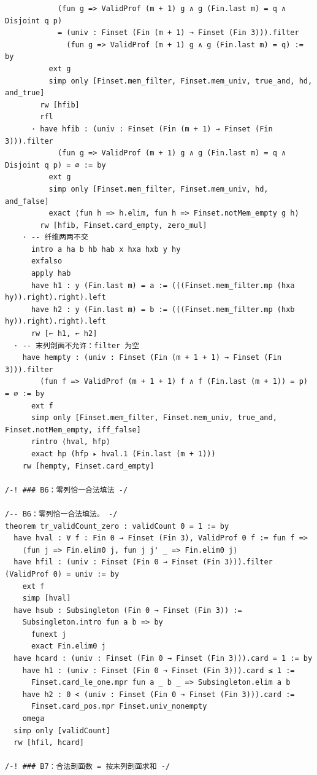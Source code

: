 \documentclass[11pt]{article}
\begin{document}
\begin{lstlisting}
            (fun g => ValidProf (m + 1) g ∧ g (Fin.last m) = q ∧ Disjoint q p)
            = (univ : Finset (Fin (m + 1) → Finset (Fin 3))).filter
              (fun g => ValidProf (m + 1) g ∧ g (Fin.last m) = q) := by
          ext g
          simp only [Finset.mem_filter, Finset.mem_univ, true_and, hd, and_true]
        rw [hfib]
        rfl
      · have hfib : (univ : Finset (Fin (m + 1) → Finset (Fin 3))).filter
            (fun g => ValidProf (m + 1) g ∧ g (Fin.last m) = q ∧ Disjoint q p) = ∅ := by
          ext g
          simp only [Finset.mem_filter, Finset.mem_univ, hd, and_false]
          exact ⟨fun h => h.elim, fun h => Finset.notMem_empty g h⟩
        rw [hfib, Finset.card_empty, zero_mul]
    · -- 纤维两两不交
      intro a ha b hb hab x hxa hxb y hy
      exfalso
      apply hab
      have h1 : y (Fin.last m) = a := (((Finset.mem_filter.mp (hxa hy)).right).right).left
      have h2 : y (Fin.last m) = b := (((Finset.mem_filter.mp (hxb hy)).right).right).left
      rw [← h1, ← h2]
  · -- 末列剖面不允许：filter 为空
    have hempty : (univ : Finset (Fin (m + 1 + 1) → Finset (Fin 3))).filter
        (fun f => ValidProf (m + 1 + 1) f ∧ f (Fin.last (m + 1)) = p) = ∅ := by
      ext f
      simp only [Finset.mem_filter, Finset.mem_univ, true_and, Finset.notMem_empty, iff_false]
      rintro ⟨hval, hfp⟩
      exact hp (hfp ▸ hval.1 (Fin.last (m + 1)))
    rw [hempty, Finset.card_empty]

/-! ### B6：零列恰一合法填法 -/

/-- B6：零列恰一合法填法。 -/
theorem tr_validCount_zero : validCount 0 = 1 := by
  have hval : ∀ f : Fin 0 → Finset (Fin 3), ValidProf 0 f := fun f =>
    ⟨fun j => Fin.elim0 j, fun j j' _ => Fin.elim0 j⟩
  have hfil : (univ : Finset (Fin 0 → Finset (Fin 3))).filter (ValidProf 0) = univ := by
    ext f
    simp [hval]
  have hsub : Subsingleton (Fin 0 → Finset (Fin 3)) :=
    Subsingleton.intro fun a b => by
      funext j
      exact Fin.elim0 j
  have hcard : (univ : Finset (Fin 0 → Finset (Fin 3))).card = 1 := by
    have h1 : (univ : Finset (Fin 0 → Finset (Fin 3))).card ≤ 1 :=
      Finset.card_le_one.mpr fun a _ b _ => Subsingleton.elim a b
    have h2 : 0 < (univ : Finset (Fin 0 → Finset (Fin 3))).card :=
      Finset.card_pos.mpr Finset.univ_nonempty
    omega
  simp only [validCount]
  rw [hfil, hcard]

/-! ### B7：合法剖面数 = 按末列剖面求和 -/


\end{lstlisting}
\end{document}
